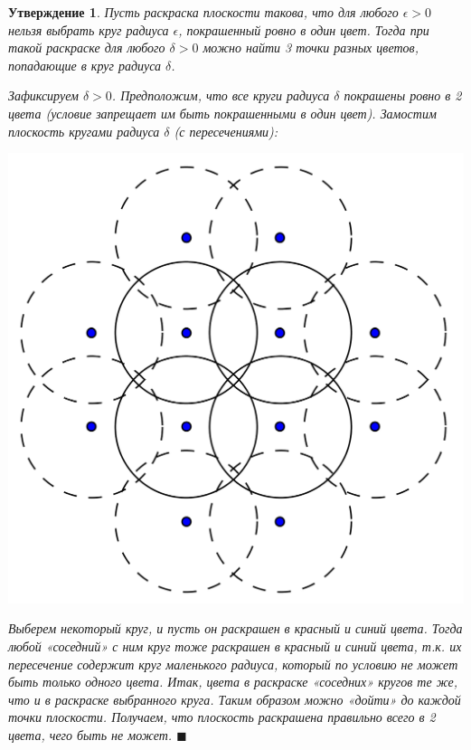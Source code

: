\documentclass{report}%
\newtheorem{claim}[theorem]{Утверждение}
\newenvironment{proof}{\par\noindent{\bf Доказательство.}}{\hfill$\scriptstyle\blacksquare$}
\begin{document}
\begin{claim}
		Пусть раскраска плоскости такова, что для любого $\epsilon > 0$ нельзя выбрать круг радиуса $\epsilon$,
		покрашенный ровно в один цвет. Тогда при такой раскраске для любого $\delta > 0$
		можно найти 3 точки разных цветов, попадающие в круг радиуса $\delta$. \\
		\begin{proof}
				Зафиксируем $\delta > 0$. Предположим, что все круги радиуса $\delta$ покрашены ровно в 2 цвета
				(условие запрещает им быть покрашенными в один цвет).
				Замостим плоскость кругами радиуса $\delta$ (с пересечениями): \\
				\begin{center}
						\includegraphics[scale = 0.5]{my_claim2}
				\end{center}
				
				Выберем некоторый круг, и пусть он раскрашен в красный и синий цвета.
				Тогда любой «соседний» с ним круг тоже раскрашен в красный и синий цвета,
				т.к. их пересечение содержит круг маленького радиуса, который по условию не может быть только одного цвета.
				Итак, цвета в раскраске «соседних» кругов те же, что и в раскраске выбранного круга.
				Таким образом можно «дойти» до каждой точки плоскости.
				Получаем, что плоскость раскрашена правильно всего в 2 цвета, чего быть не может.
		\end{proof}
\end{claim}
\end{document}
